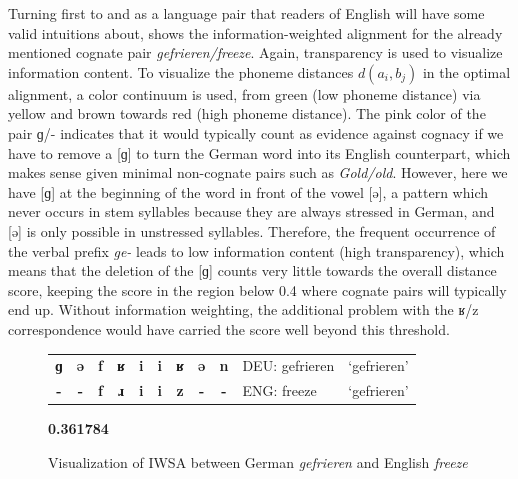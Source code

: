 Turning first to  and  as a language pair that readers of English will have some valid intuitions about,  shows the information-weighted alignment for the already mentioned cognate pair \textit{gefrieren/freeze}. Again, transparency is used to visualize information content. To visualize the phoneme distances $d(a_i,b_j)$ in the optimal alignment, a color continuum is used, from green (low phoneme distance) via yellow and brown towards red (high phoneme distance). The pink color of the pair ɡ/- indicates that it would typically count as evidence against cognacy if we have to remove a [ɡ] to turn the German word into its English counterpart, which makes sense given minimal non-cognate pairs such as \textit{Gold/old}. However, here we have [ɡ] at the beginning of the word in front of the vowel [ə], a pattern which never occurs in stem syllables because they are always stressed in German, and [ə] is only possible in unstressed syllables. Therefore, the frequent occurrence of the verbal prefix \textit{ge-} leads to low information content (high transparency), which means that the deletion of the [ɡ] counts very little towards the overall distance score, keeping the score in the region below 0.4 where cognate pairs will typically end up. Without information weighting, the additional problem with the ʁ/z correspondence would have carried the score well beyond this threshold.

\begin{figure}
\centering
\setlength\tabcolsep{0.1cm}
\begin{tabular}{cccccccccll}
\hline
{\color[rgb]{0.671,0.306,0.212} \textbf{ɡ}} & {\color[rgb]{0.580,0.576,0.349} \textbf{ə}} & {\color[rgb]{0.239,0.773,0.239} \textbf{f}} & {\color[rgb]{0.337,0.643,0.212} \textbf{ʁ}} & {\color[rgb]{0.655,0.898,0.655} \textbf{i}} & {\color[rgb]{0.655,0.898,0.655} \textbf{i}} & {\color[rgb]{0.475,0.467,0.184} \textbf{ʁ}} & {\color[rgb]{0.949,0.949,0.925} \textbf{ə}} & {\color[rgb]{0.996,0.988,0.988} \textbf{n}} & DEU: gefrieren & `gefrieren'\\
{\color[rgb]{0.671,0.306,0.212} \textbf{-}} & {\color[rgb]{0.580,0.576,0.349} \textbf{-}} & {\color[rgb]{0.094,0.729,0.094} \textbf{f}} & {\color[rgb]{0.294,0.620,0.165} \textbf{ɹ}} & {\color[rgb]{0.647,0.894,0.647} \textbf{i}} & {\color[rgb]{0.647,0.894,0.647} \textbf{i}} & {\color[rgb]{0.388,0.376,0.047} \textbf{z}} & {\color[rgb]{0.949,0.949,0.925} \textbf{-}} & {\color[rgb]{0.996,0.988,0.988} \textbf{-}} & ENG: freeze & `gefrieren'\\ \hline
\end{tabular}
{\color[rgb]{0.255,0.447,0.000} \textbf{0.361784}}\\
\caption{Visualization of IWSA between German \textit{gefrieren} and English \textit{freeze}}
\label{iwsa-example-eng-deu}
\end{figure}

